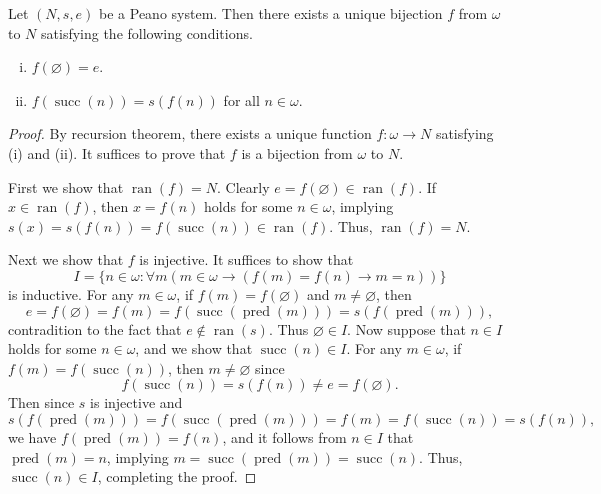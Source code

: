 \documentclass[11pt]{article}
\DeclareMathOperator{\ran}{ran}
\DeclareMathOperator{\suc}{succ}
\DeclareMathOperator{\prd}{pred}
\begin{document}
\begin{corollary}
  \label{thm:peano-isomorphism}
  Let $(N, s, e)$ be a Peano system.
  Then there exists a unique bijection $f$ from $\omega$ to $N$ satisfying the following conditions.
  \begin{enumerate}[(i)]
    \item $f(\varnothing) = e$.
    \item $f(\suc(n)) = s(f(n))$ for all $n \in \omega$.
  \end{enumerate}
\end{corollary}
\begin{proof}
  By recursion theorem, there exists a unique function $f: \omega \to N$ satisfying (i) and (ii).
  It suffices to prove that $f$ is a bijection from $\omega$ to $N$.
  \par First we show that $\ran(f) = N$.
  Clearly $e = f(\varnothing) \in \ran(f)$.
  If $x \in \ran(f)$, then $x = f(n)$ holds for some $n \in \omega$, implying $s(x) = s(f(n)) = f(\suc(n)) \in \ran(f)$.
  Thus, $\ran(f) = N$.
  \par Next we show that $f$ is injective.
  It suffices to show that
  \begin{equation*}
    I = \{n \in \omega: \forall m (m \in \omega \to (f(m) = f(n) \to m = n))\}
  \end{equation*}
  is inductive.
  For any $m \in \omega$, if $f(m) = f(\varnothing)$ and $m \neq \varnothing$, then
  \begin{equation*}
    e = f(\varnothing) = f(m) = f(\suc(\prd(m))) = s(f(\prd(m))),
  \end{equation*}
  contradition to the fact that $e \notin \ran(s)$.
  Thus $\varnothing \in I$.
  Now suppose that $n \in I$ holds for some $n \in \omega$, and we show that $\suc(n) \in I$.
  For any $m \in \omega$, if $f(m) = f(\suc(n))$, then $m \neq \varnothing$ since
  \begin{equation*}
    f(\suc(n)) = s(f(n)) \neq e = f(\varnothing).
  \end{equation*}
  Then since $s$ is injective and
  \begin{equation*}
    s(f(\prd(m))) = f(\suc(\prd(m))) = f(m) = f(\suc(n)) = s(f(n)),
  \end{equation*}
  we have $f(\prd(m)) = f(n)$, and it follows from $n \in I$ that $\prd(m) = n$, implying $m = \suc(\prd(m)) = \suc(n)$.
  Thus, $\suc(n) \in I$, completing the proof.
\end{proof}
\end{document}
